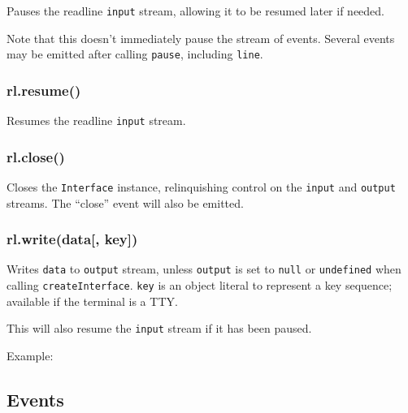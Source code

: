 Pauses the readline \texttt{input} stream, allowing it to be resumed
later if needed.

Note that this doesn't immediately pause the stream of events. Several
events may be emitted after calling \texttt{pause}, including
\texttt{line}.

\subsubsection{rl.resume()}\label{rl.resume}

Resumes the readline \texttt{input} stream.

\subsubsection{rl.close()}\label{rl.close}

Closes the \texttt{Interface} instance, relinquishing control on the
\texttt{input} and \texttt{output} streams. The ``close'' event will
also be emitted.

\subsubsection{rl.write(data{[}, key{]})}\label{rl.writedata-key}

Writes \texttt{data} to \texttt{output} stream, unless \texttt{output}
is set to \texttt{null} or \texttt{undefined} when calling
\texttt{createInterface}. \texttt{key} is an object literal to represent
a key sequence; available if the terminal is a TTY.

This will also resume the \texttt{input} stream if it has been paused.

Example:

\begin{Shaded}
\begin{Highlighting}[]
\NormalTok{(}\NormalTok{);}
\NormalTok{(}\NormalTok{, \{}\NormalTok{: }\NormalTok{, }\NormalTok{: }\NormalTok{\});}
\end{Highlighting}
\end{Shaded}

\subsection{Events}\label{events}

